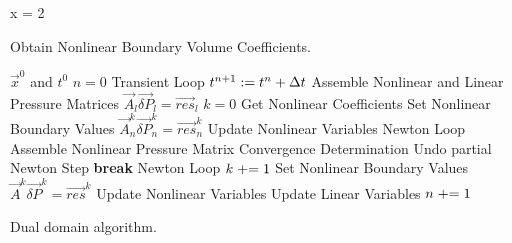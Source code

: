 \begin{algo}[h!t]
\setlength{\baselineskip}{0.625\baselineskip}
\begin{algorithmic}[1]
\Set x = 2
\end{algorithmic}
\caption{Obtain Nonlinear Boundary Volume Coefficients.}
\label{alg:domDecompGetCoef}
\end{algo}


\begin{algo}[h!t]
\setlength{\baselineskip}{0.625\baselineskip}
\begin{algorithmic}[1]
\Require $\vec{x}^{0}$ and $t^{0}$
\Set $n = 0$
\Loop \; Transient Loop
    \Set $t^{n+1} : = t^{n} + \dt{}$
	\Algorithm Assemble Nonlinear and Linear Pressure Matrices	 
		\Solve $\vec{A}_{l} \vec{\delta P}_{l} = \vec{res}_{l}$	
	\EndIf
	    \Set $k = 0$
		\Algorithm Get Nonlinear Coefficients 
		\Algorithm Set Nonlinear Boundary Values 
		\Solve $\vec{A}^{k}_{n} \vec{\delta P}_{n}^{k} = \vec{res}_{n}^{k}$	
		\Algorithm Update Nonlinear Variables  
	    \Loop \; Newton Loop
			\Algorithm Assemble Nonlinear Pressure Matrix 
			\Algorithm Convergence Determination 
				\State Undo partial Newton Step
				\State \textbf{break} Newton Loop 
			\EndIf		
			\Set $k \mathrel{+}= 1$
			\Algorithm Set Nonlinear Boundary Values 
			\Solve $\vec{A}^{k} \vec{\delta P}^{k} = \vec{res}^{k}$
			\Algorithm Update Nonlinear Variables 
		\EndLoop
	\EndIf
		\Algorithm Update Linear Variables 
	\EndIf
	\Set $n \mathrel{+}= 1$
\EndLoop
\end{algorithmic}
\caption{Dual domain \cobra{} algorithm.}
\label{alg:domDecompAlgorithm}
\end{algo}
